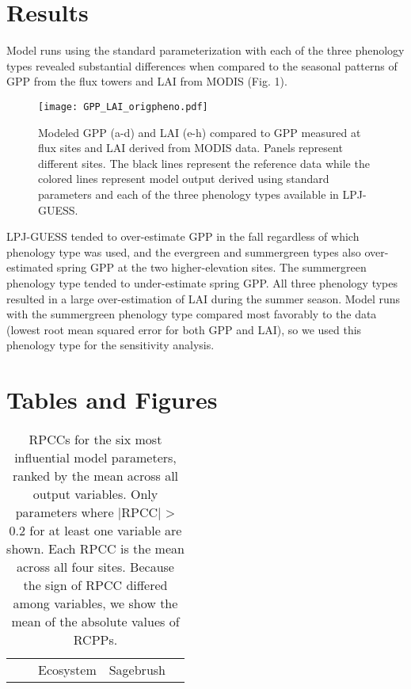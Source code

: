 \documentclass[]{article}
\begin{document}
\section{Results}
Model runs using the standard parameterization with each of the three phenology types revealed substantial differences when compared to the seasonal patterns of GPP from the flux towers and LAI from MODIS (Fig. 1). 
\begin{figure}[htbp]
	\texttt{[image: GPP\_LAI\_origpheno.pdf]}
	\caption{Modeled GPP (a-d) and LAI (e-h) compared to GPP measured at flux sites and LAI derived from MODIS data. Panels represent different sites. The black lines represent the reference data while the colored lines represent model output derived using standard parameters and each of the three phenology types available in LPJ-GUESS.}
	\label{fig:origpheno}
\end{figure}LPJ-GUESS tended to over-estimate GPP in the fall regardless of which phenology type was used, and the evergreen and summergreen types also over-estimated spring GPP at the two higher-elevation sites. The summergreen phenology type tended to under-estimate spring GPP. All three phenology types resulted in a large over-estimation of LAI during the summer season. Model runs with the summergreen phenology type compared most favorably to the data (lowest root mean squared error for both GPP and LAI), so we used this phenology type for the sensitivity analysis.

\section{Tables and Figures}
\begin{table}[ht]
	\centering
\caption{RPCCs for the six most influential model parameters, ranked by the mean across all output variables. Only parameters where |RPCC| > 0.2 for at least one variable are shown. Each RPCC is the mean across all four sites. Because the sign of RPCC differed among variables, we show the mean of the absolute values of RCPPs.} 
\begin{tabular}{lrrrrrrrr}
	\toprule
	&& \multicolumn{2}{c}{Ecosystem} & \multicolumn{4}{c}{Sagebrush} \\
	\cmidrule(lr){3-4} \cmidrule(lr){5-8}
	
\end{tabular}
\end{table}
\end{document}
